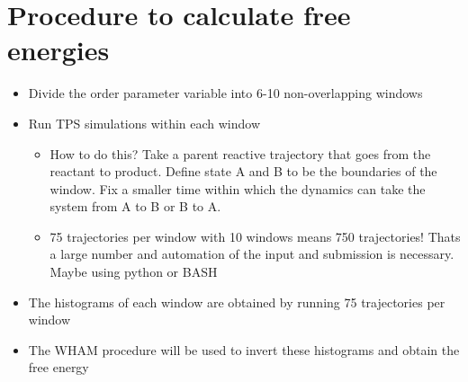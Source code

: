 \documentclass{article}
\begin{document}

\section{Procedure to calculate free energies}
\begin{itemize}
\item Divide the order parameter variable into 6-10 non-overlapping windows
\item Run TPS simulations within each window
\begin{itemize}
	\item How to do this? Take a parent reactive trajectory that goes from the reactant to product. Define state A and B to be the boundaries of the window. Fix a smaller time within which the dynamics can take the system
	from A to B or B to A. 
	\item 75 trajectories per window with 10 windows means 750 trajectories! Thats a large number and automation of the input and submission is necessary.
	Maybe using python or BASH
	\end{itemize}
\item The histograms of each window are obtained by running 75 trajectories per window
\item The WHAM procedure will be used to invert these histograms and obtain the free energy
	\end{itemize}




\end{document}

